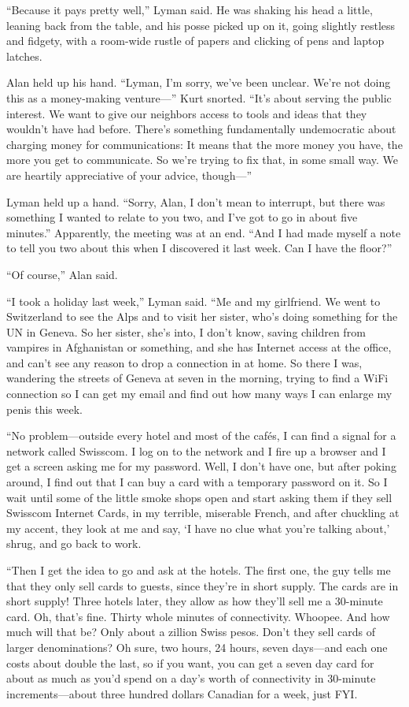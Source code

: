 \documentclass{article}
\begin{document}
``Because it pays pretty well,'' Lyman said.  He was shaking his head
a little, leaning back from the table, and his posse picked up on it,
going slightly restless and fidgety, with a room-wide rustle of papers
and clicking of pens and laptop latches.

Alan held up his hand.  ``Lyman, I'm sorry, we've been unclear.  We're
not doing this as a money-making venture---'' Kurt snorted.  ``It's
about serving the public interest.  We want to give our neighbors
access to tools and ideas that they wouldn't have had before.  There's
something fundamentally undemocratic about charging money for
communications:  It means that the more money you have, the more you
get to communicate.  So we're trying to fix that, in some small way. 
We are heartily appreciative of your advice, though---''

Lyman held up a hand.  ``Sorry, Alan, I don't mean to interrupt, but
there was something I wanted to relate to you two, and I've got to go
in about five minutes.'' Apparently, the meeting was at an end.  ``And
I had made myself a note to tell you two about this when I discovered
it last week.  Can I have the floor?''

``Of course,'' Alan said.

``I took a holiday last week,'' Lyman said.  ``Me and my girlfriend. 
We went to Switzerland to see the Alps and to visit her sister, who's
doing something for the UN in Geneva.  So her sister, she's into, I
don't know, saving children from vampires in Afghanistan or something,
and she has Internet access at the office, and can't see any reason to
drop a connection in at home.  So there I was, wandering the streets
of Geneva at seven in the morning, trying to find a WiFi connection so
I can get my email and find out how many ways I can enlarge my penis
this week.

``No problem---outside every hotel and most of the caf\'{e}s, I can
find a signal for a network called Swisscom.  I log on to the network
and I fire up a browser and I get a screen asking me for my password. 
Well, I don't have one, but after poking around, I find out that I can
buy a card with a temporary password on it.  So I wait until some of
the little smoke shops open and start asking them if they sell
Swisscom Internet Cards, in my terrible, miserable French, and after
chuckling at my accent, they look at me and say, `I have no clue what
you're talking about,' shrug, and go back to work.

``Then I get the idea to go and ask at the hotels.  The first one, the
guy tells me that they only sell cards to guests, since they're in
short supply.  The cards are in short supply!  Three hotels later,
they allow as how they'll sell me a 30-minute card.  Oh, that's fine. 
Thirty whole minutes of connectivity.  Whoopee.  And how much will
that be?  Only about a zillion Swiss pesos.  Don't they sell cards of
larger denominations?  Oh sure, two hours, 24 hours, seven days---and
each one costs about double the last, so if you want, you can get a
seven day card for about as much as you'd spend on a day's worth of
connectivity in 30-minute increments---about three hundred dollars
Canadian for a week, just FYI.
\end{document}
